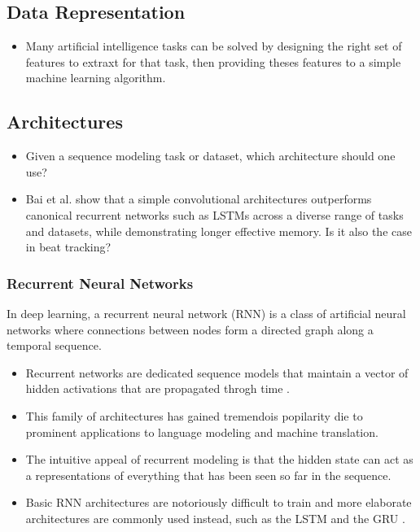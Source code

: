 \documentclass{scrartcl}
\begin{document}
\subsection{Data Representation}

\begin{itemize}
\item Many artificial intelligence tasks can be solved by designing the right set of features to extraxt for that task, then providing theses features to a simple machine learning algorithm. \cite{Goodfellow2016}
\end{itemize}




\subsection{Architectures}

\begin{itemize}
\item Given a sequence modeling task or dataset, which architecture should one use?
\item Bai et al. \cite{Bai2018} show that a simple convolutional architectures outperforms canonical recurrent networks such as LSTMs across a diverse range of tasks and datasets, while demonstrating longer effective memory. Is it also the case in beat tracking?
\end{itemize}


\subsubsection{Recurrent Neural Networks}

In deep learning, a recurrent neural network (RNN) is a class of artificial neural networks where connections between nodes form a directed graph along a temporal sequence.

\begin{itemize}
\item Recurrent networks are dedicated sequence models that maintain a vector of hidden activations that are propagated throgh time \cite{Elman1990,Werbos1990,Graves2012}.
\item This family of architectures has gained tremendois popilarity die to prominent applications to language modeling and machine translation.
\item The intuitive appeal of recurrent modeling is that the hidden state can act as a representations of everything that has been seen so far in the sequence.
\item Basic RNN architectures are notoriously difficult to train and more elaborate architectures are commonly used instead, such as the LSTM \cite{Hochreiter1997} and the GRU \cite{Cho2014}.
\end{itemize}
\end{document}
